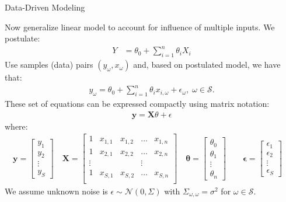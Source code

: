 \documentclass[9pt]{beamer}
\begin{document}
%
\begin{frame}{Data-Driven Modeling}

Now generalize linear model to account for influence of multiple inputs. We postulate:
\begin{align*}
Y&=\theta_0+\sum_{i=1}^n\theta_iX_i
\end{align*}
Use samples (data) pairs $(y_\omega,x_\omega)$ and, based on postulated model, we have that:
\begin{align*}
y_\omega=\theta_0+\sum_{i=1}^n\theta_i x_{i,\omega} + \epsilon_\omega,\; \omega \in \mathcal{S}.
\end{align*}
These set of equations can be expressed compactly using matrix notation:
\begin{align*}
\mathbf{y}=\mathbf{X}\theta + \epsilon
\end{align*}
where:
\begin{align*}
\mathbf{y}=\left[\begin{array}{c}y_1\\y_2\\\vdots \\ y_S\end{array}\right]\quad 
\mathbf{X}=\left[\begin{array}{ccccc}1&x_{1,1}&x_{1,2}&\hdots&x_{1,n}\\
1&x_{2,1}&x_{2,2}&\hdots&x_{2,n}\\
\vdots&&&\vdots\\
1&x_{S,1}&x_{S,2}&\hdots&x_{S,n}\\
\end{array}\right]\quad \mathbf{\theta}=\left[\begin{array}{c}\theta_0\\\theta_1\\\vdots \\ \theta_n\end{array}\right]\quad 
\quad \mathbf{\epsilon}=\left[\begin{array}{c}\epsilon_1\\\epsilon_2\\\vdots \\ \epsilon_S\end{array}\right]\quad 
\end{align*}
We assume unknown noise is $\epsilon\sim \mathcal{N}(0,\Sigma)$ with $\Sigma_{\omega,\omega}=\sigma^2$ for $\omega\in\mathcal{S}$. 

\end{frame}
\end{document}
